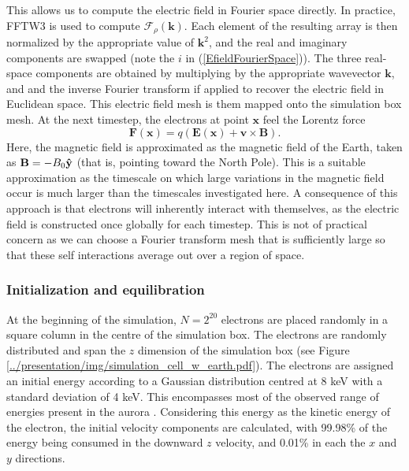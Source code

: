 \documentclass[twocolumn]{article}
\renewcommand{\vec}[1]{\mathbf{#1} }
\begin{document}
This allows us to compute the electric field in Fourier space directly. In practice, FFTW3\cite{FFTW05} is used to compute $\mathcal{F}_\rho(\vec k)$.  Each element of the resulting array is then normalized by the appropriate value of $\vec k^2$, and the real and imaginary components are swapped (note the $i$ in (\ref{EfieldFourierSpace})).  The three real-space components are obtained by multiplying by the appropriate wavevector $\vec k$, and and the inverse Fourier transform if applied to recover the electric field in Euclidean space. This electric field mesh is them mapped onto the simulation box mesh.  At the next timestep, the electrons at point $\vec x$ feel the Lorentz force
\begin{equation*}
\vec F(\vec x) = q(\vec E(\vec x) + \vec v \times \vec B).
\end{equation*}
Here, the magnetic field is approximated as the magnetic field of the Earth, taken as $\vec B = -B_0\yhat$ (that is, pointing toward the North Pole).  This is a suitable approximation as the timescale on which large variations in the magnetic field occur is much larger than the timescales investigated here.\cite{Courtillot1988}  A consequence of this approach is that electrons will inherently interact with themselves, as the electric field is constructed once globally for each timestep. This is not of practical concern as we can choose a Fourier transform mesh that is sufficiently large so that these self interactions average out over a region of space.

\subsubsection*{Initialization and equilibration}

At the beginning of the simulation, $N=2^{20}$ electrons are placed randomly in a square column in the centre of the simulation box. The electrons are randomly distributed and span the $z$ dimension of the simulation box (see Figure \ref{../presentation/img/simulation_cell_w_earth.pdf}).  The electrons are assigned an initial energy according to a Gaussian distribution centred at 8 keV with a standard deviation of 4 keV. This encompasses most of the observed range of energies present in the aurora \cite{Sandahl2008}.  Considering this energy as the kinetic energy of the electron, the initial velocity components are calculated, with 99.98\% of the energy being consumed in the downward $z$ velocity, and 0.01\% in each the $x$ and $y$ directions.
\end{document}
